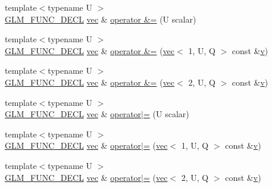 \begin{DoxyCompactItemize}
\item 
{\footnotesize template$<$typename U $>$ }\\\hyperlink{setup_8hpp_ab2d052de21a70539923e9bcbf6e83a51}{G\+L\+M\+\_\+\+F\+U\+N\+C\+\_\+\+D\+E\+CL} \hyperlink{structglm_1_1vec}{vec} \& \hyperlink{structglm_1_1vec_3_012_00_01_t_00_01_q_01_4_a554ee3843af2a7997a63333ee475b8f8}{operator \&=} (U scalar)
\item 
{\footnotesize template$<$typename U $>$ }\\\hyperlink{setup_8hpp_ab2d052de21a70539923e9bcbf6e83a51}{G\+L\+M\+\_\+\+F\+U\+N\+C\+\_\+\+D\+E\+CL} \hyperlink{structglm_1_1vec}{vec} \& \hyperlink{structglm_1_1vec_3_012_00_01_t_00_01_q_01_4_a0f1cfa1940438903f605b620a928ce38}{operator \&=} (\hyperlink{structglm_1_1vec}{vec}$<$ 1, U, Q $>$ const \&\hyperlink{_s_d_l__opengl_8h_a10a82eabcb59d2fcd74acee063775f90}{v})
\item 
{\footnotesize template$<$typename U $>$ }\\\hyperlink{setup_8hpp_ab2d052de21a70539923e9bcbf6e83a51}{G\+L\+M\+\_\+\+F\+U\+N\+C\+\_\+\+D\+E\+CL} \hyperlink{structglm_1_1vec}{vec} \& \hyperlink{structglm_1_1vec_3_012_00_01_t_00_01_q_01_4_a09a49ab5d55622ad568b054276c84786}{operator \&=} (\hyperlink{structglm_1_1vec}{vec}$<$ 2, U, Q $>$ const \&\hyperlink{_s_d_l__opengl_8h_a10a82eabcb59d2fcd74acee063775f90}{v})
\item 
{\footnotesize template$<$typename U $>$ }\\\hyperlink{setup_8hpp_ab2d052de21a70539923e9bcbf6e83a51}{G\+L\+M\+\_\+\+F\+U\+N\+C\+\_\+\+D\+E\+CL} \hyperlink{structglm_1_1vec}{vec} \& \hyperlink{structglm_1_1vec_3_012_00_01_t_00_01_q_01_4_a6f02d011da89c44a43c8ff139bafe9fa}{operator$\vert$=} (U scalar)
\item 
{\footnotesize template$<$typename U $>$ }\\\hyperlink{setup_8hpp_ab2d052de21a70539923e9bcbf6e83a51}{G\+L\+M\+\_\+\+F\+U\+N\+C\+\_\+\+D\+E\+CL} \hyperlink{structglm_1_1vec}{vec} \& \hyperlink{structglm_1_1vec_3_012_00_01_t_00_01_q_01_4_aa5a9bdd476d4095d33cd04662df20fcb}{operator$\vert$=} (\hyperlink{structglm_1_1vec}{vec}$<$ 1, U, Q $>$ const \&\hyperlink{_s_d_l__opengl_8h_a10a82eabcb59d2fcd74acee063775f90}{v})
\item 
{\footnotesize template$<$typename U $>$ }\\\hyperlink{setup_8hpp_ab2d052de21a70539923e9bcbf6e83a51}{G\+L\+M\+\_\+\+F\+U\+N\+C\+\_\+\+D\+E\+CL} \hyperlink{structglm_1_1vec}{vec} \& \hyperlink{structglm_1_1vec_3_012_00_01_t_00_01_q_01_4_ad50a7c0287c528e30aa091dd98595452}{operator$\vert$=} (\hyperlink{structglm_1_1vec}{vec}$<$ 2, U, Q $>$ const \&\hyperlink{_s_d_l__opengl_8h_a10a82eabcb59d2fcd74acee063775f90}{v})

\end{DoxyCompactItemize}
